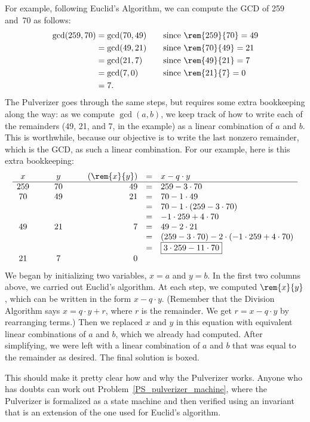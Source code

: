 For example, following Euclid's Algorithm, we can compute the GCD of 259 and~70 as follows:
\begin{align*}
\gcd(259, 70) & = \gcd(70, 49) & \quad & \text{since $\rem{259}{70} = 49$}\\ & = \gcd(49,
21) && \text{since $\rem{70}{49} = 21$} \\ & = \gcd(21, 7) && \text{since $\rem{49}{21} =
  7$} \\ & = \gcd(7, 0) && \text{since $\rem{21}{7} = 0$} \\ & = 7.
\end{align*}
The Pulverizer goes through the same steps, but requires some extra bookkeeping along the
way: as we compute $\gcd(a, b)$, we keep track of how to write each of the remainders (49,
21, and 7, in the example) as a linear combination of $a$ and $b$.  This is worthwhile,
because our objective is to write the last nonzero remainder, which is the GCD, as such a
linear combination.  For our example, here is this extra bookkeeping:
\[
\begin{array}{ccccrcl}
x & \quad & y & \quad & (\rem{x}{y}) & = & x - q \cdot y \\ \hline 259 && 70 && 49 & = &
259 - 3 \cdot 70 \\ 70 && 49 && 21 & = & 70 - 1 \cdot 49 \\ &&&& & = & 70 - 1 \cdot (259 -
3 \cdot 70) \\ &&&& & = & -1 \cdot 259 + 4 \cdot 70 \\ 49 && 21 && 7 & = & 49 - 2 \cdot 21
\\ &&&& & = & (259 - 3 \cdot 70) - 2 \cdot (-1 \cdot 259 + 4 \cdot 70) \\ &&&& & = &
\fbox{$3 \cdot 259 - 11 \cdot 70$} \\ 21 && 7 && 0
\end{array}
\]
We began by initializing two variables, $x = a$ and $y = b$.  In the first two columns
above, we carried out Euclid's algorithm.  At each step, we computed $\rem{x}{y}$, which
can be written in the form $x - q \cdot y$.  (Remember that the Division Algorithm says $x
= q \cdot y + r$, where $r$ is the remainder.  We get $r = x - q \cdot y$ by rearranging
terms.)  Then we replaced $x$ and $y$ in this equation with equivalent linear combinations
of $a$ and $b$, which we already had computed.  After simplifying, we were left with a
linear combination of $a$ and $b$ that was equal to the remainder as desired.  The final
solution is boxed.

This should make it pretty clear how and why the Pulverizer works.  Anyone who has doubts
can work out Problem~\ref{PS_pulverizer_machine}, where the Pulverizer is formalized as a
state machine and then verified using an invariant that is an extension of the one used for
Euclid's algorithm.

